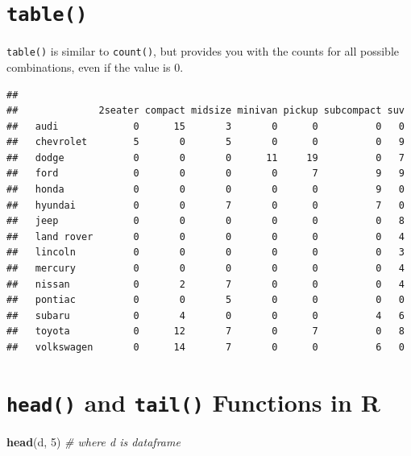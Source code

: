 \documentclass[
]{book}
\newenvironment{Shaded}{\begin{snugshade}}{\end{snugshade}}
\newcommand{\CommentTok}[1]{\textcolor[rgb]{0.56,0.35,0.01}{\textit{#1}}}
\newcommand{\DecValTok}[1]{\textcolor[rgb]{0.00,0.00,0.81}{#1}}
\newcommand{\KeywordTok}[1]{\textcolor[rgb]{0.13,0.29,0.53}{\textbf{#1}}}
\newcommand{\NormalTok}[1]{#1}
\newcommand{\OperatorTok}[1]{\textcolor[rgb]{0.81,0.36,0.00}{\textbf{#1}}}
\begin{document}
\hypertarget{table}{%
\section{\texorpdfstring{\texttt{table()}}{table()}}\label{table}}

\texttt{table()} is similar to \texttt{count()}, but provides you with the counts for all possible
combinations, even if the value is 0.

\begin{Shaded}
\end{Shaded}

\begin{verbatim}
##             
##              2seater compact midsize minivan pickup subcompact suv
##   audi             0      15       3       0      0          0   0
##   chevrolet        5       0       5       0      0          0   9
##   dodge            0       0       0      11     19          0   7
##   ford             0       0       0       0      7          9   9
##   honda            0       0       0       0      0          9   0
##   hyundai          0       0       7       0      0          7   0
##   jeep             0       0       0       0      0          0   8
##   land rover       0       0       0       0      0          0   4
##   lincoln          0       0       0       0      0          0   3
##   mercury          0       0       0       0      0          0   4
##   nissan           0       2       7       0      0          0   4
##   pontiac          0       0       5       0      0          0   0
##   subaru           0       4       0       0      0          4   6
##   toyota           0      12       7       0      7          0   8
##   volkswagen       0      14       7       0      0          6   0
\end{verbatim}

\hypertarget{head-and-tail-functions-in-r}{%
\section{\texorpdfstring{\texttt{head()} and \texttt{tail()} Functions in R}{head() and tail() Functions in R}}\label{head-and-tail-functions-in-r}}

\begin{Shaded}
\begin{Highlighting}[]
\KeywordTok{head}\NormalTok{(d, }\DecValTok{5}\NormalTok{) }\CommentTok{# where d is dataframe}
\end{Highlighting}
\end{Shaded}
\end{document}
